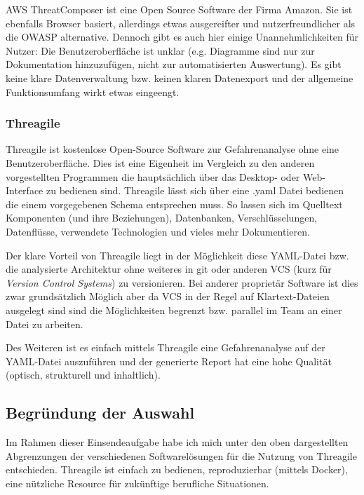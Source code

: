 \documentclass{article}
\begin{document}
AWS ThreatComposer ist eine Open Source Software der Firma Amazon. Sie ist ebenfalls 
Browser basiert, allerdings etwas ausgereifter und nutzerfreundlicher als die OWASP 
alternative. Dennoch gibt es auch hier einige Unannehmlichkeiten für Nutzer: Die 
Benutzeroberfläche ist unklar (e.g. Diagramme sind nur zur Dokumentation hinzuzufügen, 
nicht zur automatisierten Auswertung). Es gibt keine klare Datenverwaltung bzw. keinen 
klaren Datenexport und der allgemeine Funktionsumfang wirkt etwas eingeengt.

\subsubsection*{Threagile}

Threagile ist kostenlose Open-Source Software zur Gefahrenanalyse ohne eine 
Benutzeroberfläche. Dies ist eine Eigenheit im Vergleich zu den anderen vorgestellten 
Programmen die hauptsächlich über das Desktop- oder Web-Interface zu bedienen sind.
Threagile lässt sich über eine .yaml Datei bedienen die einem vorgegebenen Schema 
entsprechen muss. So lassen sich im Quelltext Komponenten (und ihre Beziehungen), 
Datenbanken, Verschlüsselungen, Datenflüsse, verwendete Technologien und vieles mehr 
Dokumentieren.

Der klare Vorteil von Threagile liegt in der Möglichkeit diese YAML-Datei bzw. die 
analysierte Architektur ohne weiteres in git oder anderen VCS (kurz für \textit{Version 
Control Systems}) zu versionieren. Bei anderer proprietär Software ist dies zwar 
grundsätzlich Möglich aber da VCS in der Regel auf Klartext-Dateien ausgelegt sind sind 
die Möglichkeiten begrenzt bzw. parallel im Team an einer Datei zu arbeiten.

Des Weiteren ist es einfach mittels Threagile eine Gefahrenanalyse auf der YAML-Datei 
auszuführen und der generierte Report hat eine hohe Qualität (optisch, strukturell und 
inhaltlich).

\subsection{Begründung der Auswahl}

Im Rahmen dieser Einsendeaufgabe habe ich mich unter den oben dargestellten Abgrenzungen 
der verschiedenen Softwarelösungen für die Nutzung von Threagile entschieden. Threagile 
ist einfach zu bedienen, reproduzierbar (mittels Docker), eine nützliche Resource für 
zukünftige berufliche Situationen.
\end{document}
